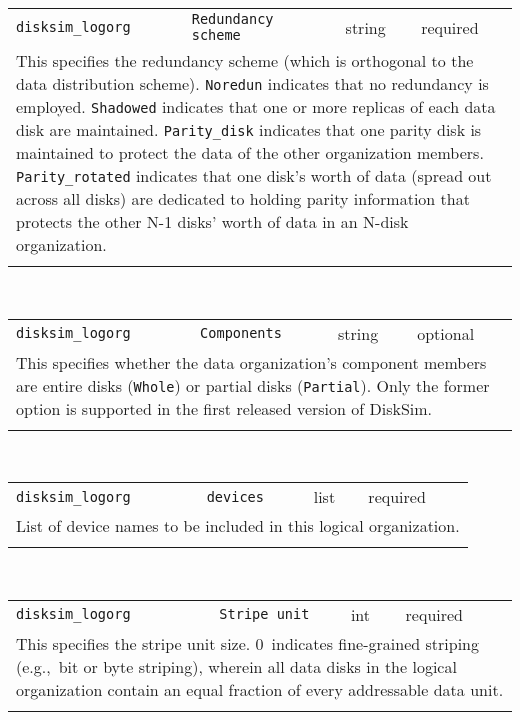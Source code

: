 \begin{tabular}{|p{1.5in}|p{3.5in}|p{0.5in}|p{0.5in}|}
\cline{1-4}
\texttt{disksim\_logorg} & \texttt{Redundancy scheme} & string & required \\ 
\cline{1-4}
\multicolumn{4}{|p{6in}|}{
This specifies the redundancy scheme (which is orthogonal to the data
distribution scheme).
\texttt{Noredun} indicates that no redundancy is employed.
\texttt{Shadowed} indicates that one or more replicas of each data disk are
maintained.
\texttt{Parity\_disk} indicates that one parity disk is maintained to
protect the data of the other organization members.
\texttt{Parity\_rotated} indicates that one disk's worth of data (spread
out across all disks) are dedicated to holding parity information that
protects the other N-1 disks' worth of data in an N-disk organization.
}\\ 
\cline{1-4}
\multicolumn{4}{p{5in}}{}\\
\end{tabular}\\ 
\noindent 
\begin{tabular}{|p{1.5in}|p{3.5in}|p{0.5in}|p{0.5in}|}
\cline{1-4}
\texttt{disksim\_logorg} & \texttt{Components} & string & optional \\ 
\cline{1-4}
\multicolumn{4}{|p{6in}|}{
This specifies whether the data organization's component members are entire
disks (\texttt{Whole}) or partial disks (\texttt{Partial}). Only the former
option is supported in the first released version of DiskSim.
}\\ 
\cline{1-4}
\multicolumn{4}{p{5in}}{}\\
\end{tabular}\\ 
\noindent 
\begin{tabular}{|p{1.5in}|p{3.5in}|p{0.5in}|p{0.5in}|}
\cline{1-4}
\texttt{disksim\_logorg} & \texttt{devices} & list & required \\ 
\cline{1-4}
\multicolumn{4}{|p{6in}|}{
List of device names to be included in this logical organization.
}\\ 
\cline{1-4}
\multicolumn{4}{p{5in}}{}\\
\end{tabular}\\ 
\noindent 
\begin{tabular}{|p{1.5in}|p{3.5in}|p{0.5in}|p{0.5in}|}
\cline{1-4}
\texttt{disksim\_logorg} & \texttt{Stripe unit} & int & required \\ 
\cline{1-4}
\multicolumn{4}{|p{6in}|}{
This specifies the stripe unit size. 0~indicates fine-grained striping
(e.g.,~bit or byte striping), wherein all data disks in the logical
organization contain an equal fraction of every addressable data unit.
}\\ 
\cline{1-4}
\multicolumn{4}{p{5in}}{}\\
\end{tabular}\\ 

